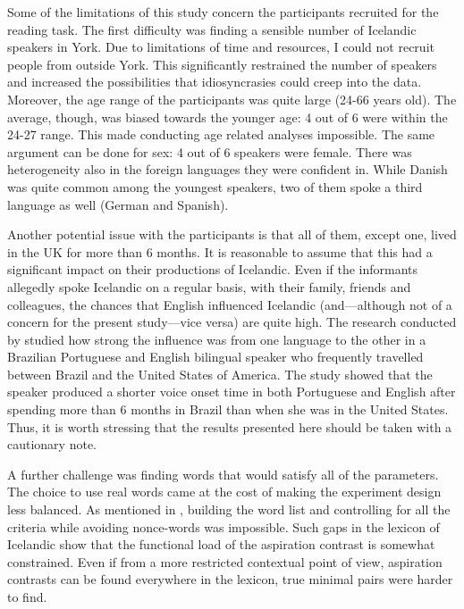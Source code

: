 \documentclass[11pt,a4paper,openany]{memoir}\usepackage[]{graphicx}\usepackage[]{color}
\begin{document}
Some of the limitations of this study concern the participants recruited for the reading task.
The first difficulty was finding a sensible number of Icelandic speakers in York.
Due to limitations of time and resources, I could not recruit people from outside York.
This significantly restrained the number of speakers and increased the possibilities that idiosyncrasies could creep into the data.
Moreover, the age range of the participants was quite large (24-66 years old).
The average, though, was biased towards the younger age: 4 out of 6 were within the 24-27 range.
This made conducting age related analyses impossible.
The same argument can be done for sex: 4 out of 6 speakers were female.
There was heterogeneity also in the foreign languages they were confident in.
While Danish was quite common among the youngest speakers, two of them spoke a third language as well (German and Spanish).

Another potential issue with the participants is that all of them, except one, lived in the UK for more than 6 months.
It is reasonable to assume that this had a significant impact on their productions of Icelandic.
Even if the informants allegedly spoke Icelandic on a regular basis, with their family, friends and colleagues, the chances that English influenced Icelandic (and---although not of a concern for the present study---vice versa) are quite high.
The research conducted by \citet{sancier1997} studied how strong the influence was from one language to the other in a Brazilian Portuguese and English bilingual speaker who frequently travelled between Brazil and the United States of America.
The study showed that the speaker produced a shorter voice onset time in both Portuguese and English after spending more than 6 months in Brazil than when she was in the United States.
Thus, it is worth stressing that the results presented here should be taken with a cautionary note.

A further challenge was finding words that would satisfy all of the parameters.
The choice to use real words came at the cost of making the experiment design less balanced.
As mentioned in , building the word list and controlling for all the criteria while avoiding nonce-words was impossible.
Such gaps in the lexicon of Icelandic show that the functional load of the aspiration contrast is somewhat constrained.
Even if from a more restricted contextual point of view, aspiration contrasts can be found everywhere in the lexicon, true minimal pairs were harder to find.
\end{document}
